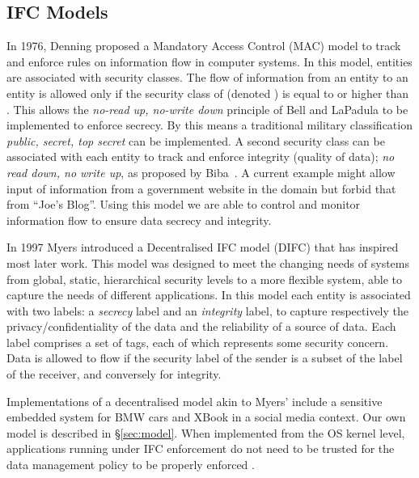 \documentclass[10pt,journal,compsoc]{IEEEtran}
\begin{document}
\subsection{IFC Models}
\label{sec:related:models}

In 1976, Denning \cite{Denning:1976:LMS:360051.360056} proposed a Mandatory Access Control (MAC) model to track and enforce rules on information flow in computer systems.  
In this model, entities are associated with security classes. The flow of information from an entity  to an entity  is allowed only if the security class of  (denoted ) is equal to or higher than . 
This allows the \emph{no-read up, no-write down} principle of Bell and LaPadula \cite{bell73} to be implemented to enforce secrecy. By this means a traditional military classification \emph{public, secret, top secret} can be implemented.
A second security class can be associated with each entity to track and enforce integrity (quality of data); 
\emph{no read down, no write up}, as proposed by Biba~\cite{citeulike:3017234}. A current example might allow input of information from a government website in the  domain but forbid that from ``Joe's Blog''. 
Using this model we are able to control and monitor information flow to ensure data secrecy and integrity.

In 1997 Myers \cite{Myers97decentralized} introduced a Decentralised IFC model (DIFC)
that has inspired most later work. This model was designed to meet the changing needs of systems from global, static, hierarchical security levels to a more flexible system, able to capture the needs of different applications. In this model each entity is associated with two labels: a \emph{secrecy} label and an \emph{integrity} label, to capture respectively the privacy/confidentiality of the data and the reliability of a source of data. Each label comprises a set of tags, each of which represents some security concern. Data is allowed to flow if the security label of the sender is a subset of the label of the receiver, and conversely for integrity. 


Implementations of a decentralised model akin to Myers' include a sensitive embedded system for BMW cars \cite{bouard2013practical} and XBook \cite{singh2009xbook} in a social media context. Our own model is described in \S\ref{sec:model}.
When implemented from the OS kernel level, applications running under IFC enforcement do not need to be trusted for the data management policy 
to be properly enforced \cite{Krohn:2007:IFC:1294261.1294293}.
\end{document}
